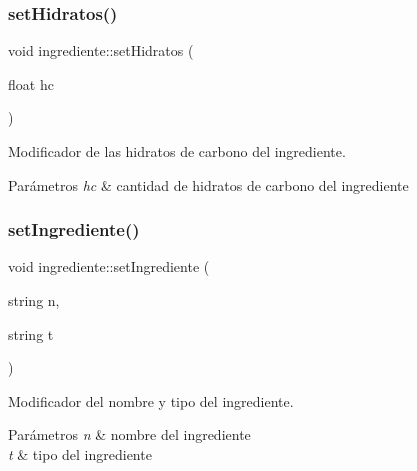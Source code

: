 \subsubsection{\texorpdfstring{set\+Hidratos()}{setHidratos()}}
{\footnotesize\ttfamily void ingrediente\+::set\+Hidratos (\begin{DoxyParamCaption}\item[{float}]{hc }\end{DoxyParamCaption})}



Modificador de las hidratos de carbono del ingrediente. 


\begin{DoxyParams}{Parámetros}
{\em hc} & cantidad de hidratos de carbono del ingrediente \\
\hline
\end{DoxyParams}
\mbox{\label{classingrediente_a72f5ea23629bc29f3b45b7631550319b}} 
\subsubsection{\texorpdfstring{set\+Ingrediente()}{setIngrediente()}\hspace{0.1cm}{\footnotesize\ttfamily [1/2]}}
{\footnotesize\ttfamily void ingrediente\+::set\+Ingrediente (\begin{DoxyParamCaption}\item[{string}]{n,  }\item[{string}]{t }\end{DoxyParamCaption})}



Modificador del nombre y tipo del ingrediente. 


\begin{DoxyParams}{Parámetros}
{\em n} & nombre del ingrediente \\
\hline
{\em t} & tipo del ingrediente \\
\hline
\end{DoxyParams}
\mbox{\label{classingrediente_ad55708ee5921247d2060bd2fc54b5f15}} 
